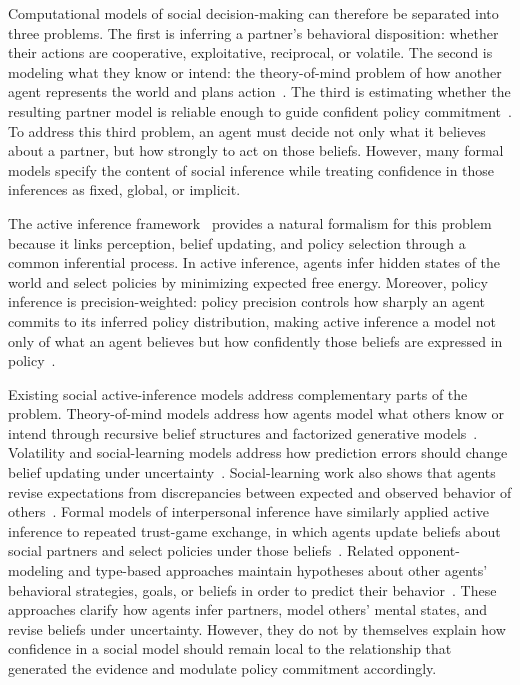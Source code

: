 \documentclass[runningheads,orivec]{llncs}
\begin{document}
Computational models of social decision-making can therefore be separated into three problems. The first is inferring a partner's behavioral disposition: whether their actions are cooperative, exploitative, reciprocal, or volatile. The second is modeling what they know or intend: the theory-of-mind problem of how another agent represents the world and plans action~\cite{FrithFrith2012,Hampton2008Mentalizing,Pitliya2025ToMActiveInference}. The third is estimating whether the resulting partner model is reliable enough to guide confident policy commitment~\cite{Schoeller2021TrustExtendedControl}. To address this third problem, an agent must decide not only what it believes about a partner, but how strongly to act on those beliefs. However, many formal models specify the content of social inference while treating confidence in those inferences as fixed, global, or implicit.

The active inference framework~\cite{Parr2022ActiveInference} provides a natural formalism for this problem because it links perception, belief updating, and policy selection through a common inferential process. In active inference, agents infer hidden states of the world and select policies by minimizing expected free energy. Moreover, policy inference is precision-weighted: policy precision controls how sharply an agent commits to its inferred policy distribution, making active inference a model not only of what an agent believes but how confidently those beliefs are expressed in policy~\cite{Friston2017ProcessTheory}.

Existing social active-inference models address complementary parts of the problem. Theory-of-mind models address how agents model what others know or intend through recursive belief structures and factorized generative models~\cite{Pitliya2025ToMActiveInference,RuizSerra2025Factorised}. Volatility and social-learning models address how prediction errors should change belief updating under uncertainty~\cite{Behrens2008SocialLearning,Diaconescu2017Hierarchical,Mathys2011HGF}. Social-learning work also shows that agents revise expectations from discrepancies between expected and observed behavior of others~\cite{joiner2017social}. Formal models of interpersonal inference have similarly applied active inference to repeated trust-game exchange, in which agents update beliefs about social partners and select policies under those beliefs~\cite{Moutoussis2014InterpersonalInference}. Related opponent-modeling and type-based approaches maintain hypotheses about other agents' behavioral strategies, goals, or beliefs in order to predict their behavior~\cite{AlbrechtStone2018ModellingAgents}. These approaches clarify how agents infer partners, model others' mental states, and revise beliefs under uncertainty. However, they do not by themselves explain how confidence in a social model should remain local to the relationship that generated the evidence and modulate policy commitment accordingly.
\end{document}
